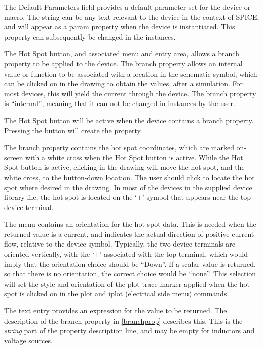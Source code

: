 The {\cb Default Parameters} field provides a default parameter set
for the device or macro.  The string can be any text relevant to the
device in the context of SPICE, and will appear as a {\et param}
property when the device is instantiated.  This property can
subsequently be changed in the instances.

The {\cb Hot Spot} button, and associated menu and entry area, allows
a {\et branch} property to be applied to the device.  The {\et branch}
property allows an internal value or function to be associated with a
location in the schematic symbol, which can be clicked on in the
drawing to obtain the values, after a simulation.  For most devices,
this will yield the current through the device.  The {\et branch}
property is ``internal'', meaning that it can not be changed in
instances by the user.

The {\cb Hot Spot} button will be active when the device contains a
{\et branch} property.  Pressing the button will create the property.

The {\et branch} property contains the hot spot coordinates, which are
marked on-screen with a white cross when the {\cb Hot Spot} button is
active.  While the {\cb Hot Spot} button is active, clicking in the
drawing will move the hot spot, and the white cross, to the
button-down location.  The user should click to locate the hot spot
where desired in the drawing.  In most of the devices in the supplied
device library file, the hot spot is located on the `$+$' symbol that
appears near the top device terminal.

The menu contains an orientation for the hot spot data.  This is
needed when the returned value is a current, and indicates the actual
direction of positive current flow, relative to the device symbol. 
Typically, the two device terminals are oriented vertically, with the
`$+$' associated with the top terminal, which would imply that the
orientation choice should be ``{\cb Down}''.  If a scalar value is
returned, so that there is no orientation, the correct choice would be
``{\cb none}''.  This selection will set the style and orientation of
the plot trace marker applied when the hot spot is clicked on in the
{\cb plot} and {\cb iplot} (electrical side menu) commands.

The text entry provides an expression for the value to be returned. 
The description of the {\et branch} property in \ref{branchprop}
describes this.  This is the {\it string} part of the property
description line, and may be empty for inductors and voltage sources.

